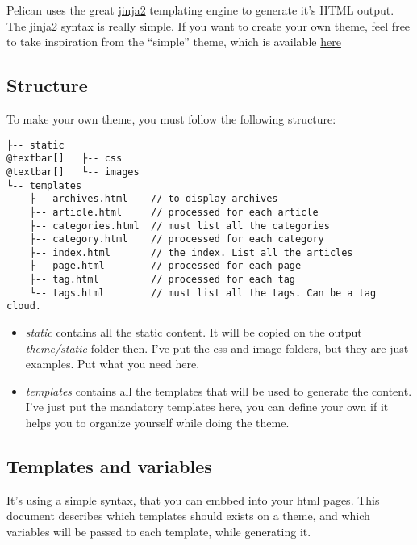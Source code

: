 \documentclass[letterpaper,10pt,english]{manual}
\begin{document}
Pelican uses the great \href{http://jinjna.pocoo.org}{jinja2} templating engine to
generate it's HTML output. The jinja2 syntax is really simple. If you want to
create your own theme, feel free to take inspiration from the ``simple'' theme,
which is available \href{https://github.com/ametaireau/pelican/tree/master/pelican/themes/simple/templates}{here}


\subsection{Structure}

To make your own theme, you must follow the following structure:

\begin{Verbatim}[commandchars=@\[\]]
├-- static
@textbar[]   ├-- css
@textbar[]   └-- images
└-- templates
    ├-- archives.html    // to display archives
    ├-- article.html     // processed for each article
    ├-- categories.html  // must list all the categories
    ├-- category.html    // processed for each category
    ├-- index.html       // the index. List all the articles
    ├-- page.html        // processed for each page
    ├-- tag.html         // processed for each tag
    └-- tags.html        // must list all the tags. Can be a tag cloud.
\end{Verbatim}
\begin{itemize}
\item {} 
\emph{static} contains all the static content. It will be copied on the output
\emph{theme/static} folder then. I've put the css and image folders, but they are
just examples. Put what you need here.

\item {} 
\emph{templates} contains all the templates that will be used to generate the content.
I've just put the mandatory templates here, you can define your own if it helps
you to organize yourself while doing the theme.

\end{itemize}


\subsection{Templates and variables}

It's using a simple syntax, that you can embbed into your html pages.
This document describes which templates should exists on a theme, and which
variables will be passed to each template, while generating it.
\end{document}
